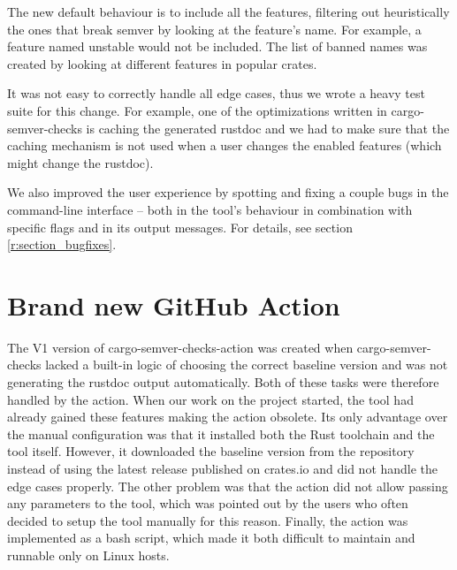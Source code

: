 \documentclass[licencjacka,en]{pracamgr}
\begin{document}
The new default behaviour is to include all the features,
filtering out heuristically the ones that break semver by looking at
the feature's name. For example, a feature named {\ttfamily unstable} would not be
included. The list of banned names was created by looking
at different features in popular crates.

It was not easy to correctly handle all edge cases,
thus we wrote a heavy test suite for this change.
For example, one of the optimizations written in cargo-semver-checks
is caching the generated rustdoc and we had to make sure that
the caching mechanism is not used when a user changes the enabled features
(which might change the rustdoc).

We also improved the user experience by spotting and fixing a couple bugs
in the command-line interface -- both in the tool's behaviour
in combination with specific flags and in its output messages.
For details, see section \ref{r:section_bugfixes}.

\section{Brand new GitHub Action}\label{r:section_github_action}

The V1 version of cargo-semver-checks-action was created when
cargo-semver-checks lacked a built-in logic of choosing the correct baseline version and was not
generating the rustdoc output automatically. Both of these tasks were therefore handled by the action.
When our work on the project started, the tool had already gained these features making the
action obsolete. Its only advantage over the manual configuration was that it
installed both the Rust toolchain and the tool itself. However, it downloaded the baseline version from
the repository instead of using the latest release published on crates.io and did not handle the edge cases
properly. The other problem was that the action did not allow passing any parameters to the tool, which
was pointed out by the users who often decided to setup the tool manually for this reason.
Finally, the action was implemented as a bash script, which made it both difficult to maintain
and runnable only on Linux hosts.
\end{document}
